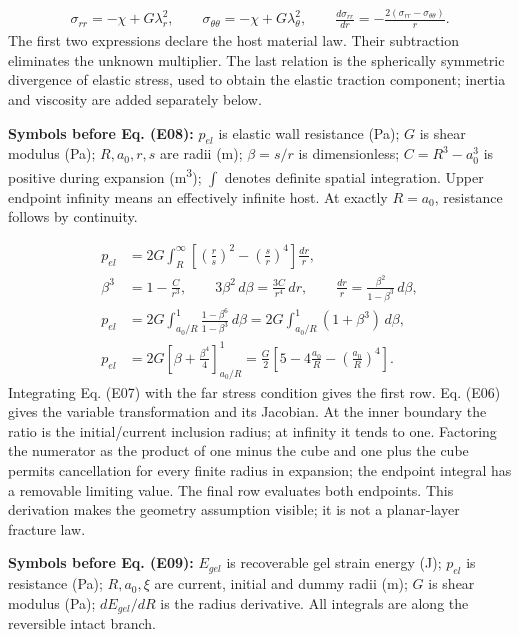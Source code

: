 \documentclass[10pt,a4paper]{article}
\begin{document}
{\small\begin{align*}
\sigma_{rr}=-\chi+G\lambda_r^2,\qquad
\sigma_{\theta\theta}=-\chi+G\lambda_\theta^2,\qquad
\frac{d\sigma_{rr}}{dr}=-\frac{2(\sigma_{rr}-\sigma_{\theta\theta})}{r}. \tag{E07}
\end{align*}}
The first two expressions declare the host material law. Their subtraction eliminates the unknown multiplier. The last relation is the spherically symmetric divergence of elastic stress, used to obtain the elastic traction component; inertia and viscosity are added separately below.

\textbf{Symbols before Eq. (E08):} $p_{el}$ is elastic wall resistance (Pa); $G$ is shear modulus (Pa); $R,a_0,r,s$ are radii (m); $\beta=s/r$ is dimensionless; $C=R^3-a_0^3$ is positive during expansion (m\textsuperscript{3}); $\int$ denotes definite spatial integration. Upper endpoint infinity means an effectively infinite host. At exactly $R=a_0$, resistance follows by continuity.

{\small\begin{align*}
p_{el}
&=2G\int_R^\infty\left[\left(\frac r s\right)^2-\left(\frac s r\right)^4\right]\frac{dr}{r},\\
\beta^3&=1-\frac C{r^3},\qquad
3\beta^2\,d\beta=\frac{3C}{r^4}\,dr,\qquad
\frac{dr}{r}=\frac{\beta^2}{1-\beta^3}\,d\beta,\\
p_{el}
&=2G\int_{a_0/R}^{1}\frac{1-\beta^6}{1-\beta^3}\,d\beta
=2G\int_{a_0/R}^{1}(1+\beta^3)\,d\beta,\\
p_{el}
&=2G\left[\beta+\frac{\beta^4}{4}\right]_{a_0/R}^{1}
=\frac G2\left[5-4\frac{a_0}{R}-\left(\frac{a_0}{R}\right)^4\right]. \tag{E08}
\end{align*}}
Integrating Eq. (E07) with the far stress condition gives the first row. Eq. (E06) gives the variable transformation and its Jacobian. At the inner boundary the ratio is the initial/current inclusion radius; at infinity it tends to one. Factoring the numerator as the product of one minus the cube and one plus the cube permits cancellation for every finite radius in expansion; the endpoint integral has a removable limiting value. The final row evaluates both endpoints. This derivation makes the geometry assumption visible; it is not a planar-layer fracture law.

\textbf{Symbols before Eq. (E09):} $E_{gel}$ is recoverable gel strain energy (J); $p_{el}$ is resistance (Pa); $R,a_0,\xi$ are current, initial and dummy radii (m); $G$ is shear modulus (Pa); $dE_{gel}/dR$ is the radius derivative. All integrals are along the reversible intact branch.
\end{document}
